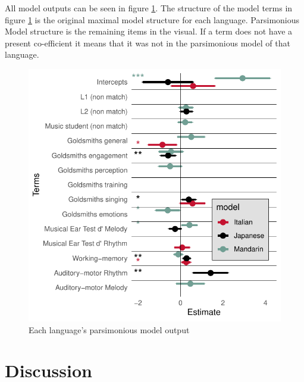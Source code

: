 \documentclass[a4paper]{article}
\begin{document}
All model outputs can be seen in figure \ref{fig:model}. The structure of the model terms in figure \ref{fig:model} is the original maximal model structure for each language. Parsimonious Model structure is the remaining items in the visual. If a term does not have a present co-efficient it means that it was not in the parsimonious model of that language.

\begin{figure}[t]
  \centering
  \includegraphics[width=\linewidth]{SP_24_visuals/Japanese,Italian,_Mandarin_max_models_structure:_parsimonious_effects.pdf}
  \caption{Each language's parsimonious model output}
  \label{fig:model}
\end{figure}

\section{Discussion}
\end{document}
